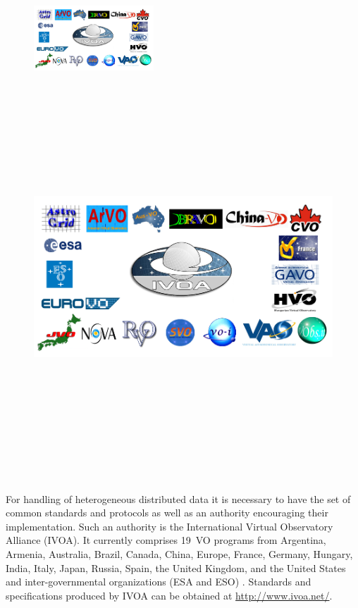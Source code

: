 \documentclass[a4paper,10pt,oneside,onecolumn]{article}
\begin{document}
   \begin{figure}
     \vspace{0pt}
     \begin{center}
       \ifpdf
       \includegraphics[width=0.4\textwidth]{ivoamembers}
       \else
       \includegraphics[bb = 92 86 545 742, height=6in]{ivoamembers.jpg}
       \fi
     \end{center}
     \vspace{-15pt}
     \vspace{-5pt}
   \end{figure}


   For handling of heterogeneous distributed data it is necessary to
   have the set of common standards and protocols as well as an
   authority encouraging their implementation. Such an authority is
   the International Virtual Observatory Alliance (IVOA). It currently
   comprises 19~VO programs from Argentina, Armenia, Australia,
   Brazil, Canada, China, Europe, France, Germany, Hungary, India,
   Italy, Japan, Russia, Spain, the United Kingdom, and the United
   States and inter-governmental organizations (ESA and ESO)
   \cite{hanisch2010international}. Standards and specifications
   produced by IVOA can be obtained at \url{http://www.ivoa.net/}.
\end{document}
